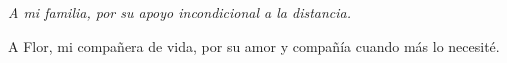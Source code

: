 \newpage


\vspace*{5\baselineskip}

\begin{flushright}
    \itshape
    A mi familia, por su apoyo incondicional a la distancia.

    A Flor, mi compañera de vida, por su amor y compañía cuando más lo necesité.
\end{flushright}